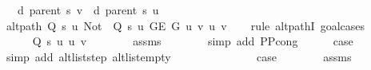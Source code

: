 \begin{isabellebody}
\ \ \ {\isachardoublequoteopen}d\ {\isacharparenleft}{\kern0pt}parent\ s{\isacharparenright}{\kern0pt}\ v\ {\isasymle}\ d\ {\isacharparenleft}{\kern0pt}parent\ s{\isacharparenright}{\kern0pt}\ u\ {\isacharplus}{\kern0pt}\ {}{\isachardoublequoteclose}%
\endisataginvisible
{\isafoldinvisible}%
%
\isadeliminvisible
\isanewline
%
\endisadeliminvisible
%
\isadelimproof
%
\endisadelimproof
%
\isatagproof
{}\isamarkupfalse%
\ {\isacharminus}{\kern0pt}\isanewline
\ \ \isamarkupfalse%
\ {\isachardoublequoteopen}alt{\isacharunderscore}{\kern0pt}path\ {\isacharparenleft}{\kern0pt}Q\ s\ u{\isacharparenright}{\kern0pt}\ {\isacharparenleft}{\kern0pt}Not\ {\isasymcirc}\ Q\ s\ u{\isacharparenright}{\kern0pt}\ {\isacharparenleft}{\kern0pt}G{\isachardot}{\kern0pt}E\ G{\isacharparenright}{\kern0pt}\ {\isacharbrackleft}{\kern0pt}u{\isacharcomma}{\kern0pt}\ v{\isacharbrackright}{\kern0pt}\ u\ v{\isachardoublequoteclose}\isanewline
\ \ \isamarkupfalse%
\ {\isacharparenleft}{\kern0pt}rule\ alt{\isacharunderscore}{\kern0pt}pathI{\isacharcomma}{\kern0pt}\ goal{\isacharunderscore}{\kern0pt}cases{\isacharparenright}{\kern0pt}\isanewline
\ \ \ \ \isamarkupfalse%
\ {}\isanewline
\ \ \ \ \isamarkupfalse%
\ {\isachardoublequoteopen}Q\ s\ u\ {\isacharbraceleft}{\kern0pt}u{\isacharcomma}{\kern0pt}\ v{\isacharbraceright}{\kern0pt}{\isachardoublequoteclose}\isanewline
\ \ \ \ \ \ \isamarkupfalse%
\ assms{\isacharparenleft}{\kern0pt}{}{\isacharparenright}{\kern0pt}\isanewline
\ \ \ \ \ \ \isamarkupfalse%
\ {\isacharparenleft}{\kern0pt}simp\ add{\isacharcolon}{\kern0pt}\ P{\isacharunderscore}{\kern0pt}P{\isacharprime}{\kern0pt}{\isacharprime}{\kern0pt}{\isacharunderscore}{\kern0pt}cong{\isacharparenright}{\kern0pt}\isanewline
\ \ \ \ \isamarkupfalse%
\ {\isacharquery}{\kern0pt}case\isanewline
\ \ \ \ \ \ \isamarkupfalse%
\ {\isacharparenleft}{\kern0pt}simp\ add{\isacharcolon}{\kern0pt}\ alt{\isacharunderscore}{\kern0pt}list{\isacharunderscore}{\kern0pt}step\ alt{\isacharunderscore}{\kern0pt}list{\isacharunderscore}{\kern0pt}empty{\isacharparenright}{\kern0pt}\isanewline
\ \ \isamarkupfalse%
\isanewline
\ \ \ \ \isamarkupfalse%
\ {}\isanewline
\ \ \ \ \isamarkupfalse%
\ {\isacharquery}{\kern0pt}case\isanewline
\ \ \ \ \ \ \isamarkupfalse%
\ assms{\isacharparenleft}{\kern0pt}{}{\isacharparenright}{\kern0pt}\isanewline

\end{isabellebody}
